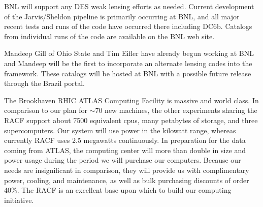 \documentclass[12pt]{article}
\begin{document}
BNL will support any DES weak lensing efforts as needed.  Current development
of the Jarvis/Sheldon pipeline is primarily occurring at BNL, and all major
recent tests and runs of the code have occurred there including DC6b.  Catalogs
from individual runs of the code are available on the BNL web site.

Mandeep Gill of Ohio State and Tim Eifler have already begun working at BNL and
Mandeep will be the first to incorporate an alternate lensing codes into the
framework.  These catalogs will be hosted at BNL with a possible future
release through the Brazil portal. 


The Brookhaven RHIC ATLAS Computing Facility is massive and world class.  In
comparison to our plan for $\sim$70 new machines, the other experiments sharing
the RACF support about 7500 equivalent cpus, many petabytes of storage, and
three supercomputers.  Our system will use power in the kilowatt range, whereas
currently RACF uses 2.5 megawatts continuously.  In preparation for the data
coming from ATLAS, the computing center will more than double in size and power
usage during the period we will purchase our computers.  Because our needs are
insignificant in comparison, they will provide us with complimentary power,
cooling, and maintenance, as well as bulk purchasing discounts of order 40\%.
The RACF is an excellent base upon which to build our computing initiative.




\end{document}
